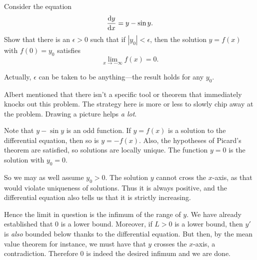 \begin{problem}\label{problem:ODE-manual-gradual-proof}
	Consider the equation
	\[
		\deriv[x][y] = y -\sin y.
	\]
	Show that there is an $\epsilon >0$ such that if $|y_0|<\epsilon$, then the solution $y = f(x)$ with $f(0) = y_0$ satisfies
	\[
		\lim_{x\to -\infty} f(x) = 0.
	\]
\end{problem}
\begin{solution}
	Actually, $\epsilon$ can be taken to be anything---the result holds for any $y_0$.
	
	Albert mentioned that there isn't a specific tool or theorem that immediately knocks out this problem. The strategy here is more or less to slowly chip away at the problem. Drawing a picture helps \emph{a lot}.
	
	Note that $y - \sin y$ is an odd function. If $y=f(x)$ is a solution to the differential equation, then so is $y = -f(x)$. Also, the hypotheses of Picard's theorem are satisfied, so solutions are locally unique. The function $y=0$ is the solution with $y_0 = 0$.
	
	So we may as well assume $y_0 > 0$. The solution $y$ cannot cross the $x$-axis, as that would violate uniqueness of solutions. Thus it is always positive, and the differential equation also tells us that it is strictly increasing.
	
	Hence the limit in question is the infimum of the range of $y$. We have already established that 0 is a lower bound. Moreover, if $L > 0$ is a lower bound, then $y'$ is \emph{also} bounded below thanks to the differential equation. But then, by the mean value theorem for instance, we must have that $y$ crosses the $x$-axis, a contradiction. Therefore 0 is indeed the desired infimum and we are done.
\end{solution}